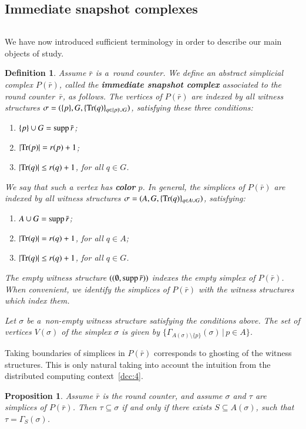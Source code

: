 \documentclass{amsart}[10pt]
\newtheorem{df}[theorem]{Definition}
\newtheorem{prop}[theorem]{Proposition}
\newcommand{\es}{\emptyset}
\newcommand{\supp}{\text{\rm supp}\,}
\newcommand{\tr}{{\bar r}}
\newcommand{\trc}{{\text{\rm Tr}}}
\newcommand{\ab}{\allowbreak}
\numberwithin{equation}{section}
\numberwithin{figure}{section}
\numberwithin{table}{section}
\begin{document}
\subsection{Immediate snapshot complexes} $\,$

\nin We have now introduced sufficient terminology in order to
describe our main objects of study.

\begin{df}\label{df:ptr}
Assume $\tr$ is a~round counter. We define an abstract simplicial
complex $P(\tr)$, called the {\bf immediate snapshot complex}
associated to the round counter~$\tr$, as follows. The vertices of
$P(\tr)$ are indexed by all witness structures $\sigma=(\{p\},\ab
G,\ab \{\trc(q)\}_{q\in\{p\}\cup G})$, satisfying these three
conditions:
\begin{enumerate}
\item $\{p\}\cup G=\supp\tr$;
\item $|\trc(p)|=r(p)+1$;
\item $|\trc(q)|\leq r(q)+1$, for all $q\in G$.
\end{enumerate}
\nin We say that such a vertex has {\bf color} $p$. In general, the
simplices of $P(\tr)$ are indexed by all witness structures
$\sigma=(A,\ab G,\ab \{\trc(q)\}_{q\in A\cup G})$, satisfying:
\begin{enumerate}
\item $A\cup G=\supp\tr$;
\item $|\trc(q)|=r(q)+1$, for all $q\in A$;
\item $|\trc(q)|\leq r(q)+1$, for all $q\in G$.
\end{enumerate}

\nin The empty witness structure $((\es,\supp\tr))$ indexes the empty
simplex of $P(\tr)$. When convenient, we identify the simplices of
$P(\tr)$ with the witness structures which index them.  

Let $\sigma$ be a~non-empty witness structure satisfying the
conditions above. The set of vertices $V(\sigma)$ of the simplex $\sigma$
is given by $\{\Gamma_{A(\sigma)\setminus\{p\}}(\sigma)\,|\,p\in A\}$.
\end{df}

Taking boundaries of simplices in $P(\tr)$ corresponds to ghosting of
the witness structures. This is only natural taking into account the
intuition from the distributed computing context~\ref{dcc:4}.

\begin{prop}
\label{prop:b}
Assume $\tr$ is the round counter, and assume $\sigma$ and $\tau$ are
simplices of $P(\tr)$. Then $\tau\subseteq\sigma$ if and only if there
exists $S\subseteq A(\sigma)$, such that $\tau=\Gamma_S(\sigma)$.
\end{prop}
\end{document}

